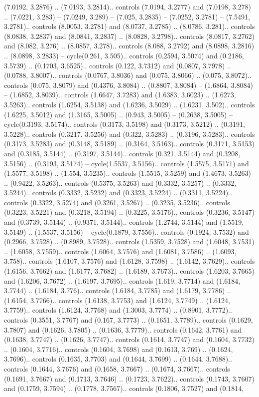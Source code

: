 (7.0192, 3.2876) .. (7.0193, 3.2814).. controls (7.0194, 3.2777) and (7.0198, 3.278) .. (7.0221, 3.283) -- (7.0249, 3.289) -- (7.025, 3.2835) -- (7.0252, 3.2781) -- (7.5491, 3.2781).. controls (8.0053, 3.2781) and (8.0737, 3.2785) .. (8.0786, 3.281).. controls (8.0838, 3.2837) and (8.0841, 3.2837) .. (8.0828, 3.2798).. controls (8.0817, 3.2762) and (8.082, 3.276) .. (8.0857, 3.278).. controls (8.088, 3.2792) and (8.0898, 3.2816) .. (8.0898, 3.2833) -- cycle(0.261, 3.505).. controls (0.2594, 3.5074) and (0.2186, 3.5739) .. (0.1703, 3.6525).. controls (0.122, 3.7312) and (0.0807, 3.7978) .. (0.0788, 3.8007).. controls (0.0767, 3.8036) and (0.075, 3.8066) .. (0.075, 3.8072).. controls (0.075, 3.8079) and (0.4376, 3.8084) .. (0.8807, 3.8084) -- (1.6864, 3.8084) -- (1.6852, 3.8039).. controls (1.6647, 3.7283) and (1.6383, 3.6023) .. (1.6273, 3.5263).. controls (1.6254, 3.5138) and (1.6236, 3.5029) .. (1.6231, 3.502).. controls (1.6225, 3.5012) and (1.3165, 3.5005) .. (0.943, 3.5005) -- (0.2638, 3.5005) -- cycle(0.3193, 3.5174).. controls (0.3173, 3.5198) and (0.3173, 3.5212) .. (0.3191, 3.5228).. controls (0.3217, 3.5256) and (0.322, 3.5283) .. (0.3196, 3.5283).. controls (0.3173, 3.5283) and (0.3148, 3.5189) .. (0.3164, 3.5163).. controls (0.3171, 3.5153) and (0.3185, 3.5144) .. (0.3197, 3.5144).. controls (0.321, 3.5144) and (0.3208, 3.5156) .. (0.3193, 3.5174) -- cycle(1.5537, 3.5156).. controls (1.5575, 3.5171) and (1.5577, 3.5198) .. (1.554, 3.5235).. controls (1.5515, 3.5259) and (1.4673, 3.5263) .. (0.9422, 3.5263).. controls (0.5375, 3.5263) and (0.3332, 3.5257) .. (0.3332, 3.5244).. controls (0.3332, 3.5232) and (0.3323, 3.5224) .. (0.3311, 3.5224).. controls (0.3322, 3.5274) and (0.3261, 3.5267) .. (0.3235, 3.5236).. controls (0.3223, 3.5221) and (0.3218, 3.5194) .. (0.3225, 3.5176).. controls (0.3236, 3.5147) and (0.3739, 3.5144) .. (0.9371, 3.5144).. controls (1.2744, 3.5144) and (1.5519, 3.5149) .. (1.5537, 3.5156) -- cycle(0.1879, 3.7556).. controls (0.1924, 3.7532) and (0.2966, 3.7528) .. (0.8989, 3.7528).. controls (1.5359, 3.7528) and (1.6048, 3.7531) .. (1.6058, 3.7559).. controls (1.6064, 3.7576) and (1.6081, 3.7586) .. (1.6093, 3.758).. controls (1.6107, 3.7576) and (1.6128, 3.7598) .. (1.6142, 3.7629).. controls (1.6156, 3.7662) and (1.6177, 3.7682) .. (1.6189, 3.7673).. controls (1.6203, 3.7665) and (1.6206, 3.7672) .. (1.6197, 3.7695).. controls (1.619, 3.7714) and (1.6184, 3.7744) .. (1.6184, 3.776).. controls (1.6184, 3.7785) and (1.6179, 3.7786) .. (1.6154, 3.7766).. controls (1.6138, 3.7753) and (1.6124, 3.7749) .. (1.6124, 3.7759).. controls (1.6124, 3.7768) and (1.3003, 3.7774) .. (0.8901, 3.7772).. controls (0.3551, 3.7767) and (0.167, 3.7773) .. (0.1651, 3.7789).. controls (0.1629, 3.7807) and (0.1626, 3.7805) .. (0.1636, 3.7779).. controls (0.1642, 3.7761) and (0.1638, 3.7747) .. (0.1626, 3.7747).. controls (0.1614, 3.7747) and (0.1604, 3.7732) .. (0.1604, 3.7716).. controls (0.1604, 3.7698) and (0.1613, 3.769) .. (0.1624, 3.7696).. controls (0.1635, 3.7703) and (0.1644, 3.7699) .. (0.1644, 3.7688).. controls (0.1644, 3.7676) and (0.1658, 3.7667) .. (0.1674, 3.7667).. controls (0.1691, 3.7667) and (0.1713, 3.7646) .. (0.1723, 3.7622).. controls (0.1743, 3.7607) and (0.1759, 3.7594) .. (0.1778, 3.7567).. controls (0.1806, 3.7527) and (0.1814, 